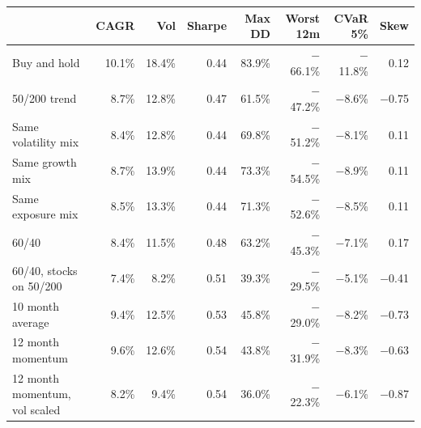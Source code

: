 \begin{tabular}{lrrrrrrr}
\toprule
 & CAGR & Vol & Sharpe & Max DD & Worst 12m & CVaR 5\% & Skew \\
\midrule
Buy and hold & 10.1\% & 18.4\% & 0.44 & 83.9\% & $-$66.1\% & $-$11.8\% & 0.12 \\
50/200 trend & 8.7\% & 12.8\% & 0.47 & 61.5\% & $-$47.2\% & $-$8.6\% & $-$0.75 \\
Same volatility mix & 8.4\% & 12.8\% & 0.44 & 69.8\% & $-$51.2\% & $-$8.1\% & 0.11 \\
Same growth mix & 8.7\% & 13.9\% & 0.44 & 73.3\% & $-$54.5\% & $-$8.9\% & 0.11 \\
Same exposure mix & 8.5\% & 13.3\% & 0.44 & 71.3\% & $-$52.6\% & $-$8.5\% & 0.11 \\
60/40 & 8.4\% & 11.5\% & 0.48 & 63.2\% & $-$45.3\% & $-$7.1\% & 0.17 \\
60/40, stocks on 50/200 & 7.4\% & 8.2\% & 0.51 & 39.3\% & $-$29.5\% & $-$5.1\% & $-$0.41 \\
10 month average & 9.4\% & 12.5\% & 0.53 & 45.8\% & $-$29.0\% & $-$8.2\% & $-$0.73 \\
12 month momentum & 9.6\% & 12.6\% & 0.54 & 43.8\% & $-$31.9\% & $-$8.3\% & $-$0.63 \\
12 month momentum, vol scaled & 8.2\% & 9.4\% & 0.54 & 36.0\% & $-$22.3\% & $-$6.1\% & $-$0.87 \\
\bottomrule
\end{tabular}
